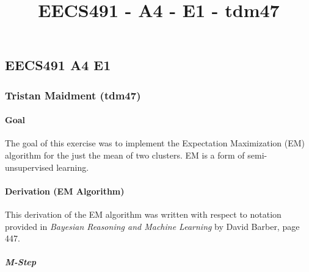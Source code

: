 \documentclass[11pt]{article}
\title{EECS491 - A4 - E1 - tdm47}
\begin{document}
    
    
    \maketitle
    
    

    
    \hypertarget{eecs491-a4-e1}{%
\subsection{EECS491 A4 E1}\label{eecs491-a4-e1}}

\hypertarget{tristan-maidment-tdm47}{%
\subsubsection{Tristan Maidment (tdm47)}\label{tristan-maidment-tdm47}}

\hypertarget{goal}{%
\paragraph{Goal}\label{goal}}

The goal of this exercise was to implement the Expectation Maximization
(EM) algorithm for the just the mean of two clusters. EM is a form of
semi-unsupervised learning.

\hypertarget{derivation-em-algorithm}{%
\paragraph{Derivation (EM Algorithm)}\label{derivation-em-algorithm}}

This derivation of the EM algorithm was written with respect to notation
provided in \emph{Bayesian Reasoning and Machine Learning} by David
Barber, page 447.

\hypertarget{m-step}{%
\subparagraph{M-Step}\label{m-step}}
\end{document}
